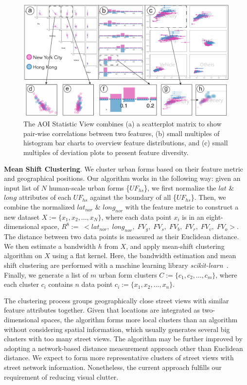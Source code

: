 \begin{figure}[t]
	\centering
	\includegraphics[width=0.9\columnwidth]{figure/streetvizor/fig5_statistic_view/statistic_view}
	\vspace{-4mm}
	\caption{The AOI Statistic View combines (a) a scatterplot matrix to show pair-wise correlations between two features, (b) small multiples of histogram bar charts to overview feature distributions, and (c) small multiples of deviation plots to present feature diversity. }
	\label{fig:c1_statistic_view}
	\vspace{-1mm}
\end{figure}

\vspace*{2mm}
\noindent
\textbf{Mean Shift Clustering}.
We cluster urban forms based on their feature metric and geographical positions.
Our algorithm works in the following way: 
given an input list of $N$ human-scale urban forms \{$UF_{hs}$\}, we first normalize the $lat$ \& $long$ attributes of each $UF_{hs}$ against the boundary of all \{$UF_{hs}$\}.
Then, we combine the normalized $lat_{nor}$ \& $long_{nor}$ with the feature metric to construct a new dataset $X := \{x_1, x_2, ..., x_N\}$, where each data point $x_i$ is in an eight-dimensional space, $R^{8} := \; <lat_{nor}, \; long_{nor}, \; FV_g, \; FV_s, \; FV_b, \; FV_r, \; FV_v, \; FV_o>$.
The distance between two data points is measured as their Euclidean distance.
We then estimate a bandwidth $h$ from $X$, and apply mean-shift clustering algorithm on $X$ using a flat kernel.
Here, the bandwidth estimation and mean shift clustering are performed with a machine learning library \textit{scikit-learn}~\cite{scikit-learn}.
Finally, we generate a list of $m$ urban form clusters $C := \{c_1, c_2, ..., c_m\}$, where each cluster $c_i$ contains $n$ data point $c_i := \{x_1, x_2, ..., x_n\}$.

The clustering process groups geographically close street views with similar feature attributes together.
Given that locations are integrated as two-dimensional spaces, the algorithm forms more local clusters than an algorithm without considering spatial information, which usually generates several big clusters with too many street views.
The algorithm may be further improved by adopting a network-based distance measurement approach other than Euclidean distance.
We expect to form more representative clusters of street views with street network information.
Nonetheless, the current approach fulfills our requirement of reducing visual clutter.

